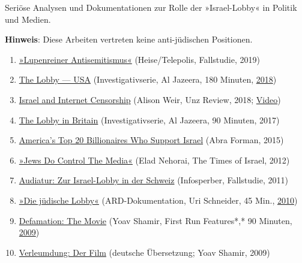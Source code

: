Seriöse Analysen und Dokumentationen zur Rolle der »Israel-Lobby« in
Politik und Medien.

\textbf{Hinweis}: Diese Arbeiten vertreten keine anti-jüdischen
Positionen.

\begin{enumerate}
\def\labelenumi{\arabic{enumi}.}
\tightlist
\item
  \href{https://www.heise.de/tp/features/Lupenreiner-Antisemitismus-4500315.html?seite=all}{»Lupenreiner
  Antisemitismus«} (Heise/Telepolis, Fallstudie, 2019)
\item
  \href{https://www.youtube.com/watch?v=MnzRsfMqOqI}{The Lobby --- USA}
  (Investigativserie, Al Jazeera, 180 Minuten,
  \href{https://electronicintifada.net/blogs/asa-winstanley/al-jazeera-denies-qatari-emir-censored-israel-lobby-film}{2018})
\item
  \href{http://www.unz.com/article/how-israel-and-its-partisans-work-to-censor-the-internet/}{Israel
  and Internet Censorship} (Alison Weir, Unz Review, 2018;
  \href{https://www.bitchute.com/video/GsNHqtjALSHJ/}{Video})
\item
  \href{https://www.youtube.com/watch?v=ceCOhdgRBoc}{The Lobby in
  Britain} (Investigativserie, Al Jazeera, 90 Minuten, 2017)
\item
  \href{https://www.breakingisraelnews.com/52318/exclusive-americas-top-20-richest-pro-israel-zionaires-technology-and-business/}{America's
  Top 20 Billionaires Who Support Israel} (Abra Forman, 2015)
\item
  \href{https://web.archive.org/web/20120705065748/http://blogs.timesofisrael.com/jews-do-control-the-media/}{»Jews
  Do Control The Media«} (Elad Nehorai, The Times of Israel, 2012)
\item
  \href{https://www.infosperber.ch/Politik/Pro-Israel-Meinungsmache-wird-professionalisiert}{Audiatur:
  Zur Israel-Lobby in der Schweiz} (Infosperber, Fallstudie, 2011)
\item
  \href{https://www.youtube.com/watch?v=wtZTonPDF0c}{»Die jüdische
  Lobby«} (ARD-Dokumentation, Uri Schneider, 45 Min.,
  \href{https://programm.ard.de/Programm/Jetzt-im-TV/die-juedische-lobby/eid_281065887293981}{2010})
\item
  \href{https://archive.org/details/Defamation}{Defamation: The Movie}
  (Yoav Shamir, First Run Features*,* 90 Minuten,
  \href{https://en.wikipedia.org/wiki/Defamation_(film)}{2009})
\item
  \href{https://www.bitchute.com/video/EL4w9x9xVlZ4/}{Verleumdung: Der
  Film} (deutsche Übersetzung; Yoav Shamir, 2009)

\end{enumerate}

